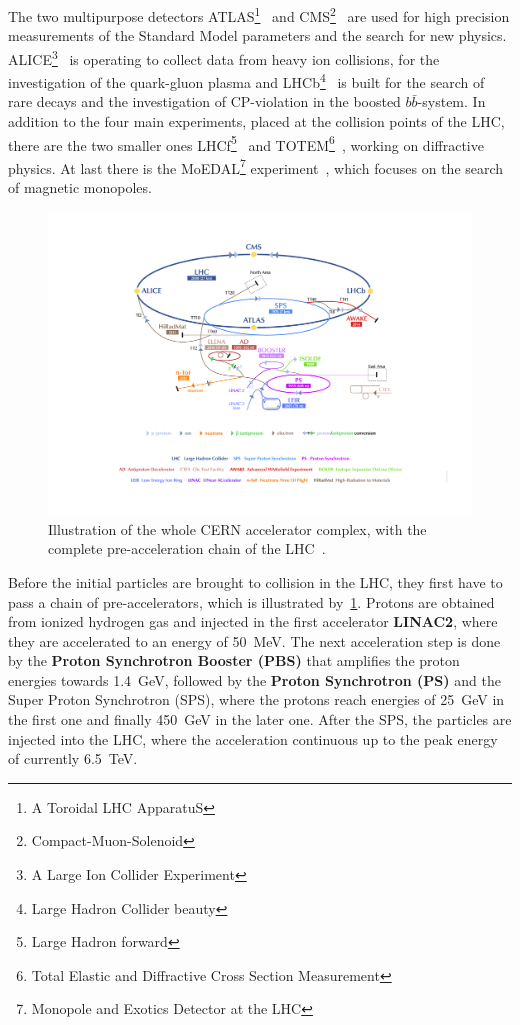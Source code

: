  The two multipurpose detectors ATLAS\footnote{A Toroidal LHC ApparatuS}~\cite{Aad:2008zzm} and CMS\footnote{Compact-Muon-Solenoid}~\cite{Chatrchyan:2008aa} are used for high precision measurements of the Standard Model parameters and the search for new physics. ALICE\footnote{A Large Ion Collider Experiment}~\cite{Aamodt:2008zz} is operating to collect data from heavy ion collisions, for the investigation of the quark-gluon plasma and LHCb\footnote{Large Hadron Collider beauty}~\cite{Alves:2008zz} is built for the search of rare decays and the investigation of CP-violation in the boosted $b\bar{b}$-system. In addition to the four main experiments, placed at the collision points of the LHC, there are the two smaller ones LHCf\footnote{Large Hadron forward}~\cite{Adriani:2008zz} and TOTEM\footnote{Total Elastic and Diffractive Cross Section Measurement}~\cite{Anelli:2008zza}, working on diffractive physics. At last there is the MoEDAL\footnote{Monopole and Exotics Detector at the LHC} experiment~\cite{Pinfold:2009oia}, which focuses on  the search of magnetic monopoles. 
\begin{figure}[h]
	\centering
	\includegraphics[width=1.0\linewidth]{Pics/cp3/32}
	\caption{Illustration of the whole CERN accelerator complex, with the complete pre-acceleration chain of the LHC~\cite{DeMelis:2119882}.} 
	\label{fig:32}
\end{figure}

 Before the initial particles are brought to collision in the LHC, they first have to pass a chain of pre-accelerators, which is illustrated by~\cref{fig:32}. Protons  are obtained from ionized hydrogen gas and injected in the first accelerator \textbf{LINAC2}, where they are accelerated to an energy of 50~MeV. The next acceleration step is done by the \textbf{Proton Synchrotron Booster (PBS)} that amplifies the proton energies towards 1.4~GeV, followed by the \textbf{Proton Synchrotron (PS)} and the {Super Proton Synchrotron (SPS)}, where the protons reach energies of 25~GeV in the first one and finally 450~GeV in the later one. After the SPS, the particles are injected into the {LHC}, where the acceleration continuous up to the peak energy of currently 6.5~TeV.

